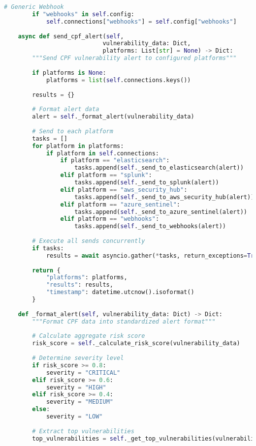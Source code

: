 \documentclass[11pt,a4paper]{article}
\begin{document}
\begin{lstlisting}[language=Python, caption=SIEM Integration Module]
        # Generic Webhook
        if "webhooks" in self.config:
            self.connections["webhooks"] = self.config["webhooks"]
    
    async def send_cpf_alert(self,
                            vulnerability_data: Dict,
                            platforms: List[str] = None) -> Dict:
        """Send CPF vulnerability alert to configured platforms"""
        
        if platforms is None:
            platforms = list(self.connections.keys())
        
        results = {}
        
        # Format alert data
        alert = self._format_alert(vulnerability_data)
        
        # Send to each platform
        tasks = []
        for platform in platforms:
            if platform in self.connections:
                if platform == "elasticsearch":
                    tasks.append(self._send_to_elasticsearch(alert))
                elif platform == "splunk":
                    tasks.append(self._send_to_splunk(alert))
                elif platform == "aws_security_hub":
                    tasks.append(self._send_to_aws_security_hub(alert))
                elif platform == "azure_sentinel":
                    tasks.append(self._send_to_azure_sentinel(alert))
                elif platform == "webhooks":
                    tasks.append(self._send_to_webhooks(alert))
        
        # Execute all sends concurrently
        if tasks:
            results = await asyncio.gather(*tasks, return_exceptions=True)
        
        return {
            "platforms": platforms,
            "results": results,
            "timestamp": datetime.utcnow().isoformat()
        }
    
    def _format_alert(self, vulnerability_data: Dict) -> Dict:
        """Format CPF data into standardized alert format"""
        
        # Calculate aggregate risk score
        risk_score = self._calculate_risk_score(vulnerability_data)
        
        # Determine severity level
        if risk_score >= 0.8:
            severity = "CRITICAL"
        elif risk_score >= 0.6:
            severity = "HIGH"
        elif risk_score >= 0.4:
            severity = "MEDIUM"
        else:
            severity = "LOW"
        
        # Extract top vulnerabilities
        top_vulnerabilities = self._get_top_vulnerabilities(vulnerability_data)
        

\end{lstlisting}
\end{document}
